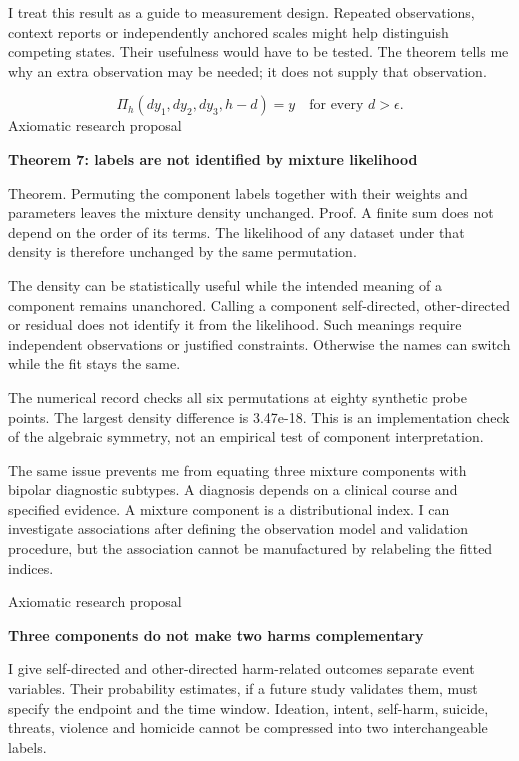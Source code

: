 \documentclass[10pt]{article}
\begin{document}
I treat this result as a guide to measurement design. Repeated observations, context reports or independently anchored scales might help distinguish competing states. Their usefulness would have to be tested. The theorem tells me why an extra observation may be needed; it does not supply that observation.\par
\[\Pi_h(dy_1,dy_2,dy_3,h-d)=y\quad\text{for every }d>\epsilon.\]
\clearpage
{\small\color{accent}Axiomatic research proposal}\par
{\LARGE\bfseries\color{ink}Theorem 7: labels are not identified by mixture likelihood}\par\vspace{7pt}
Theorem. Permuting the component labels together with their weights and parameters leaves the mixture density unchanged. Proof. A finite sum does not depend on the order of its terms. The likelihood of any dataset under that density is therefore unchanged by the same permutation.\par
The density can be statistically useful while the intended meaning of a component remains unanchored. Calling a component self-directed, other-directed or residual does not identify it from the likelihood. Such meanings require independent observations or justified constraints. Otherwise the names can switch while the fit stays the same.\par
The numerical record checks all six permutations at eighty synthetic probe points. The largest density difference is 3.47e-18. This is an implementation check of the algebraic symmetry, not an empirical test of component interpretation.\par
The same issue prevents me from equating three mixture components with bipolar diagnostic subtypes. A diagnosis depends on a clinical course and specified evidence. A mixture component is a distributional index. I can investigate associations after defining the observation model and validation procedure, but the association cannot be manufactured by relabeling the fitted indices.\par
\clearpage
{\small\color{accent}Axiomatic research proposal}\par
{\LARGE\bfseries\color{ink}Three components do not make two harms complementary}\par\vspace{7pt}
I give self-directed and other-directed harm-related outcomes separate event variables. Their probability estimates, if a future study validates them, must specify the endpoint and the time window. Ideation, intent, self-harm, suicide, threats, violence and homicide cannot be compressed into two interchangeable labels.\par
\end{document}
